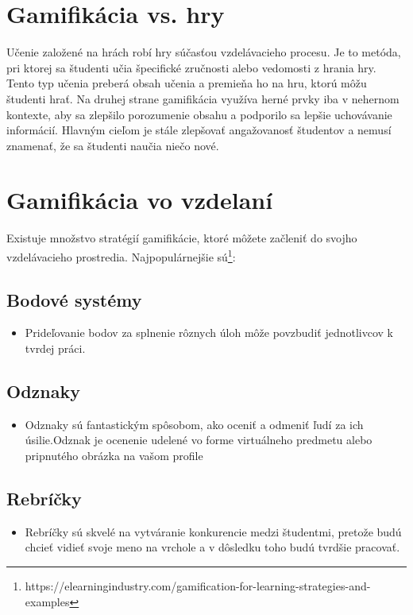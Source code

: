 \documentclass[10pt,twoside,slovak,a4paper]{article}
\begin{document}
\section{Gamifikácia vs. hry} 
Učenie založené na hrách robí hry súčasťou vzdelávacieho procesu.
Je to metóda, pri ktorej sa študenti učia špecifické zručnosti alebo vedomosti z hrania hry.
Tento typ učenia preberá obsah učenia a premieňa ho na hru, ktorú môžu študenti hrať.
Na druhej strane gamifikácia využíva herné prvky iba v nehernom kontexte, aby sa zlepšilo porozumenie obsahu a podporilo sa lepšie uchovávanie informácií.
Hlavným cieľom je stále zlepšovať angažovanosť študentov a nemusí znamenať, že sa študenti naučia niečo nové.


\section{Gamifikácia vo vzdelaní} 

Existuje množstvo stratégií gamifikácie, ktoré môžete začleniť do svojho vzdelávacieho prostredia.
Najpopulárnejšie sú\footnote{https://elearningindustry.com/gamification-for-learning-strategies-and-examples}: 
\subsection{Bodové systémy}
    \begin{itemize}
    \item Prideľovanie bodov za splnenie rôznych úloh môže povzbudiť    jednotlivcov k tvrdej práci.
    \end{itemize}

\subsection{Odznaky}
    
    \begin{itemize}
    \item  Odznaky sú fantastickým spôsobom, ako oceniť a odmeniť ľudí za ich úsilie.Odznak je ocenenie udelené vo forme virtuálneho predmetu alebo pripnutého obrázka na vašom profile
    \end{itemize}
 
\subsection{Rebríčky} 

    \begin{itemize}
    \item Rebríčky sú skvelé na vytváranie konkurencie medzi študentmi, pretože budú chcieť vidieť svoje meno na vrchole a v dôsledku toho budú tvrdšie pracovať.
    \end{itemize}
\end{document}
